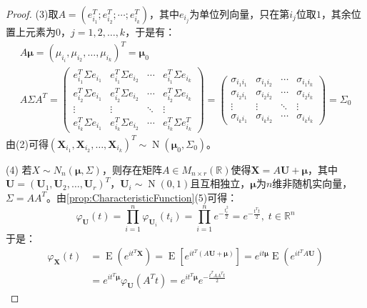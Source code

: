 \begin{proof}
	(3)取$A=(e_{i_1}^T;e_{i_2}^T;\cdots;e_{i_k}^T)$，其中$e_{i_j}$为单位列向量，只在第$i_j$位取$1$，其余位置上元素为$0$，$j=1,2,\dots,k$，于是有：
	\begin{gather*}
		A\boldsymbol{\mu}=(\mu_{i_i},\mu_{i_2},\dots,\mu_{i_k})^T=\boldsymbol{\mu}_0
		\\
		A\Sigma A^T=
		\begin{pmatrix}
			e_{i_1}^T\Sigma e_{i_1} & e_{i_1}^T\Sigma e_{i_2} & \cdots & e_{i_1}^T\Sigma e_{i_k} \\
			e_{i_2}^T\Sigma e_{i_1} & e_{i_2}^T\Sigma e_{i_2} & \cdots & e_{i_2}^T\Sigma e_{i_k} \\
			\vdots & \vdots & \ddots & \vdots \\
			e_{i_k}^T\Sigma e_{i_1} & e_{i_k}^T\Sigma e_{i_2} & \cdots & e_{i_k}^T\Sigma e_{i_k}^T
		\end{pmatrix}
		=
		\begin{pmatrix}
			\sigma_{i_1i_1} & \sigma_{i_1i_2} & \cdots & \sigma_{i_1i_k} \\
			\sigma_{i_2i_1} & \sigma_{i_2i_2} & \cdots & \sigma_{i_2i_k} \\
			\vdots & \vdots & \ddots & \vdots \\
			\sigma_{i_ki_1} & \sigma_{i_ki_2} & \cdots & \sigma_{i_ki_k}
		\end{pmatrix}
		=\Sigma_0
	\end{gather*}
	由(2)可得$(\mathbf{X}_{i_1},\mathbf{X}_{i_2},\dots,\mathbf{X}_{i_k})^T\sim \operatorname{N}(\boldsymbol{\mu}_0,\Sigma_0)$。\par
	(4)	若$X\sim N_n(\boldsymbol{\mu},\Sigma)$，则存在矩阵$A\in M_{n\times r}(\mathbb{R})$使得$\mathbf{X}=A\mathbf{U}+\boldsymbol{\mu}$，其中$\mathbf{U}=(\mathbf{U}_1,\mathbf{U}_2,\dots,\mathbf{U}_r)^T$，$\mathbf{U}_i\sim \operatorname{N}(0,1)$且互相独立，$\boldsymbol{\mu}$为$n$维非随机实向量，$\Sigma=AA^T$。由\cref{prop:CharacteristicFunction}(5)可得：
	\begin{equation*}
		\varphi_\mathbf{U}(t)=\prod_{i=1}^n\varphi_{\mathbf{U}_i}(t_i)
		=\prod_{i=1}^ne^{-\frac{t_i^2}{2}}=e^{-\frac{t^Tt}{2}},\;t\in\mathbb{R}^{n}
	\end{equation*}
	于是：
	\begin{align*}
		\varphi_\mathbf{X}(t)
		&=\operatorname{E}(e^{it^T\mathbf{X}})
		=\operatorname{E}[e^{it^T(A\mathbf{U}+\boldsymbol{\mu})}]
		=e^{it\boldsymbol{\mu}}\operatorname{E}(e^{it^TA\mathbf{U}}) \\
		&=e^{it^T\boldsymbol{\mu}}\varphi_\mathbf{U}(A^Tt)
		=e^{it^T\boldsymbol{\mu}}e^{-\frac{t^TAA^Tt}{2}}

\end{align*}
\end{proof}

